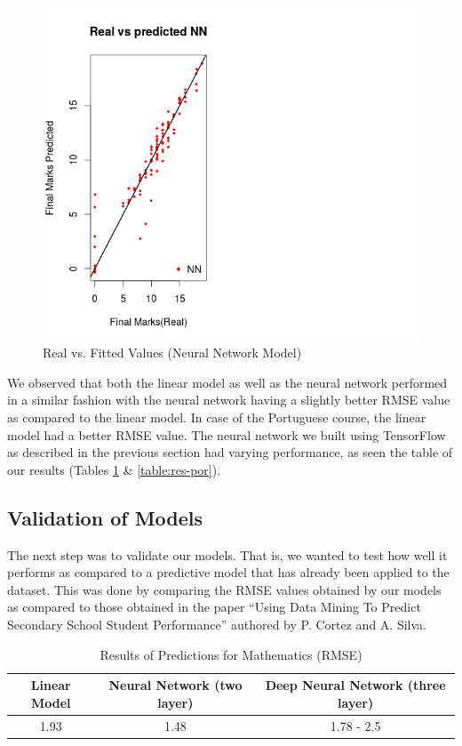 \documentclass[conference]{IEEEtran}
\begin{document}
\begin{figure}
	\includegraphics[width=\linewidth]{math_nn.png}
	\caption{Real vs. Fitted Values (Neural Network Model)}
	\label{fig:math-nn}
\end{figure}

We observed that both the linear model as well as the neural network performed in a similar fashion with the neural network having a slightly better RMSE value as compared to the linear model. In case of the Portuguese course, the linear model had a better RMSE value. The neural network we built using TensorFlow \cite{tensorflow2015-whitepaper} as described in the previous section had varying performance, as seen the table of our results (Tables \ref{table:res-mat} \& \ref{table:res-por}).

	\subsection{Validation of Models}
The next step was to validate our models. That is, we wanted to test how well it
performs as compared to a predictive model that has already been applied to the
dataset. This was done by comparing the RMSE values obtained by our models as compared to those obtained in the paper “Using Data Mining To Predict Secondary
School Student Performance” authored by P. Cortez and A. Silva.

\begin{table}[!t]
\renewcommand{\arraystretch}{1.3}
\caption{Results of Predictions for Mathematics (RMSE)}
\label{table:res-mat}
\centering
\begin{tabular}{|c c c|}
\hline
\bfseries Linear Model & \bfseries Neural Network (two layer) & \bfseries Deep Neural Network (three layer)\\
\hline
1.93 & 1.48 & 1.78 - 2.5\\
\hline
\end{tabular}
\end{table}
\end{document}
